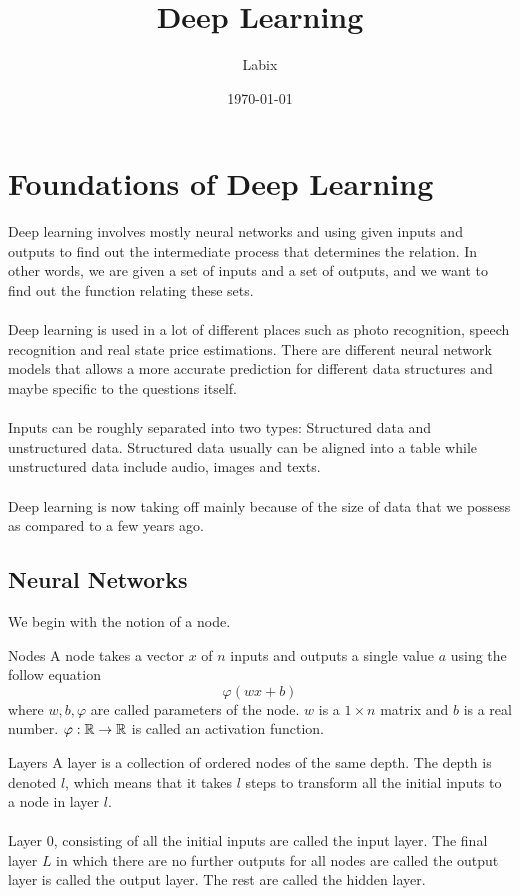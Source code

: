 \documentclass[a4paper]{article}
\title{Deep Learning}
\author{Labix}
\date{\today}
\begin{document}
\maketitle
\begin{abstract}
\end{abstract}
\tableofcontents
\pagebreak

\section{Foundations of Deep Learning}
Deep learning involves mostly neural networks and using given inputs and outputs to find out the intermediate process that determines the relation. In other words, we are given a set of inputs and a set of outputs, and we want to find out the function relating these sets. \\~\\
Deep learning is used in a lot of different places such as photo recognition, speech recognition and real state price estimations. There are different neural network models that allows a more accurate prediction for different data structures and maybe specific to the questions itself. \\~\\
Inputs can be roughly separated into two types: Structured data and unstructured data. Structured data usually can be aligned into a table while unstructured data include audio, images and texts. \\~\\
Deep learning is now taking off mainly because of the size of data that we possess as compared to a few years ago. 

\subsection{Neural Networks}
We begin with the notion of a node. 
\begin{defn}{Nodes}{} A node takes a vector $x$ of $n$ inputs and outputs a single value $a$ using the follow equation $$\varphi(wx+b)$$ where $w,b,\varphi$ are called parameters of the node. $w$ is a $1\times n$ matrix and $b$ is a real number. $\varphi:\mathbb{R}\to\mathbb{R}$ is called an activation function. 
\end{defn}

\begin{defn}{Layers}{} A layer is a collection of ordered nodes of the same depth. The depth is denoted $l$, which means that it takes $l$ steps to transform all the initial inputs to a node in layer $l$. \\~\\
Layer $0$, consisting of all the initial inputs are called the input layer. The final layer $L$ in which there are no further outputs for all nodes are called the output layer is called the output layer. The rest are called the hidden layer. 
\end{defn}
\end{document}
